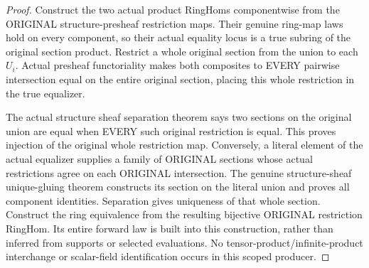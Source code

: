 \begin{proof}
Construct the two actual product RingHoms componentwise from the ORIGINAL
structure-presheaf restriction maps. Their genuine ring-map laws hold on
every component, so their actual equality locus is a true subring of the
original section product. Restrict a whole original section from the union
to each $U_i$. Actual presheaf functoriality makes both composites to EVERY
pairwise intersection equal on the entire original section, placing this
whole restriction in the true equalizer.

The actual structure sheaf separation theorem says two sections on the
original union are equal when EVERY such original restriction is equal.
This proves injection of the original whole restriction map. Conversely,
a literal element of the actual equalizer supplies a family of ORIGINAL
sections whose actual restrictions agree on each ORIGINAL intersection.
The genuine structure-sheaf unique-gluing theorem constructs its section
on the literal union and proves all component identities. Separation gives
uniqueness of that whole section. Construct the ring equivalence from the
resulting bijective ORIGINAL restriction RingHom. Its entire forward law
is built into this construction, rather than inferred from supports or
selected evaluations. No tensor-product/infinite-product interchange or
scalar-field identification occurs in this scoped producer.
\end{proof}
